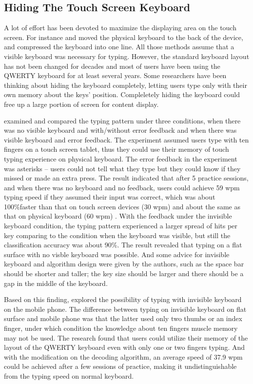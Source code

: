 \documentclass[11pt]{article}
\begin{document}
\subsection{Hiding The Touch Screen Keyboard}
A lot of effort has been devoted to maximize the displaying area on the touch screen. For instance \citet{10.1145/1851600.1851630} and \citet{10.1145/2212776.2223676} moved the physical keyboard to the back of the device, and \citet{10.1145/2047196.2047257} compressed the keyboard into one line. All those methods assume that a visible keyboard was necessary for typing. However, the standard keyboard layout has not been changed for decades and most of users have been using the QWERTY keyboard for at least several years. Some researchers have been thinking about hiding the keyboard completely, letting users type only with their own memory about the keys' position. Compleletely hiding the keyboard could free up a large portion of screen for content display.

\citet{10.1145/1978942.1979301} examined and compared the typing pattern under three conditions, when there was no visible keyboard and with/without error feedback and when there was visible keyboard and error feedback. The experiment assumed users type with ten fingers on a touch screen tablet, thus they could use their memory of touch typing experience on physical keyboard. The error feedback in the experiment was asterisks -- users could not tell what they type but they could know if they missed or made an extra press. The result indicated that after 5 practice sessions, and when there was no keyboard and no feedback, users could achieve 59 wpm typing speed if they assumed their input was correct, which was about 100\%faster than that on touch screen devices (30 wpm) and about the same as that on physical keyboard (60 wpm) \citep{10.1145/3173574.3174220}. With the feedback under the invisible keyboard condition, the typing pattern experienced a larger spread of hits per key comparing to the condition when the keyboard was visible, but still the classification accuracy was about 90\%. The result revealed that typing on a flat surface with no visble keyboard was possible. And some advice for invisible keyboard and algorithm design were given by the authors, such as the space bar should be shorter and taller; the key size should be larger and there should be a gap in the middle of the keyboard.

Based on this finding, \citet{10.1145/3173574.3174013} explored the possibility of typing with invisible keyboard on the mobile phone. The difference between typing on invisible keyboard on flat surface and mobile phone was that the latter used only two thumbs or an index finger, under which condition the knowledge about ten fingers muscle memory may not be used. The research found that users could utilize their memory of the layout of the QWERTY keyboard even with only one or two fingers typing. And with the modification on the decoding algorithm, an average speed of 37.9 wpm could be achieved after a few sessions of practice, making it undistinguishable from the typing speed on normal keyboard.
\end{document}
